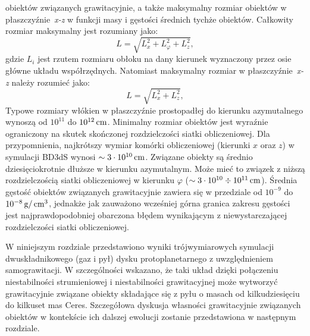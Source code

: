 obiektów związanych grawitacyjnie, a także maksymalny rozmiar obiektów w
płaszczyźnie~\emph{x-z} w funkcji masy i gęstości średnich tychże obiektów.
Całkowity rozmiar maksymalny jest rozumiany jako:
%
\begin{equation}
   L = \sqrt{L_x^2 + L_\varphi^2 + L_z^2},
\end{equation}
%
gdzie $L_i$ jest rzutem rozmiaru obłoku na dany kierunek wyznaczony przez osie
główne układu współrzędnych. Natomiast maksymalny rozmiar w
płaszczyźnie~\emph{x-z} należy rozumieć jako:
%
\begin{equation}
   L = \sqrt{L_x^2 + L_z^2},
\end{equation}
%
Typowe rozmiary włókien w płaszczyźnie prostopadłej do kierunku azymutalnego
wynoszą od $10^{11}$ do $10^{12}\hbox{$\thinspace\textrm{cm}$}$. Minimalny rozmiar obiektów jest wyraźnie
ograniczony na skutek skończonej rozdzielczości siatki obliczeniowej. Dla
przypomnienia, najkrótszy wymiar komórki obliczeniowej (kierunki $x$ oraz $z$) w
symulacji BD3dS wynosi $\sim 3\cdot10^{10}\hbox{$\thinspace\textrm{cm}$}$. Związane obiekty są średnio
dziesięciokrotnie dłuższe w kierunku azymutalnym. Może mieć to związek z niższą
rozdzielczością siatki obliczeniowej w kierunku $\varphi$ ($\sim 3\cdot10^{10}
\div 10^{11}\hbox{$\thinspace\textrm{cm}$}$). Średnia gęstość obiektów związanych grawitacyjnie zawiera się
w przedziale od $10^{-9}$ do $10^{-8}\hbox{$\thinspace\textrm{g}$}/\hbox{$\thinspace\textrm{cm}$}^{3}$, jednakże jak zauważono
wcześniej górna granica zakresu gęstości jest najprawdopodobniej obarczona
błędem wynikającym z niewystarczającej rozdzielczości siatki obliczeniowej.
%
\par W niniejszym rozdziale przedstawiono wyniki trójwymiarowych symulacji
dwuskładnikowego (gaz i pył) dysku protoplanetarnego z uwzględnieniem
samograwitacji. W szczególności wskazano, że taki układ dzięki połączeniu
niestabilności strumieniowej i niestabilności grawitacyjnej może wytworzyć
grawitacyjnie związane obiekty składające się z pyłu o masach od kilkudziesięciu
do kilkuset mas Ceres. Szczegółowa dyskusja własności grawitacyjnie związanych
obiektów w kontekście ich dalszej ewolucji zostanie przedstawiona w następnym
rozdziale.
%

